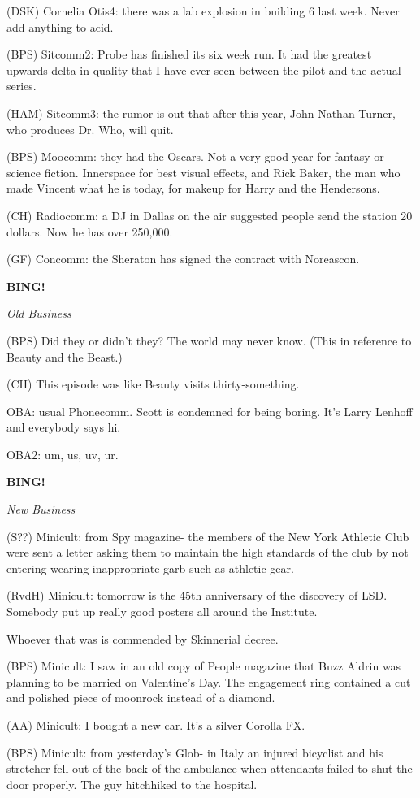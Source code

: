 \documentclass[12pt]{article}
\newcommand{\bing}{{\bf BING!} }
\newcommand{\goto}[1]{\bing \vskip 12pt \centerline{{\em{#1}}}}
\begin{document}
(DSK) Cornelia Otis4: there was a lab explosion in building 6 last week. Never add anything to acid.

(BPS) Sitcomm2: Probe has finished its six week run. It had the greatest upwards delta in quality that I have ever seen between the pilot and the actual series.

(HAM) Sitcomm3: the rumor is out that after this year, John Nathan Turner, who produces Dr. Who, will quit.

(BPS) Moocomm: they had the Oscars. Not a very good year for fantasy or science fiction. Innerspace for best visual effects, and Rick Baker, the man who made Vincent what he is today, for makeup for Harry and the Hendersons.

(CH) Radiocomm: a DJ in Dallas on the air suggested people send the station 20 dollars. Now he has over 250,000.

(GF) Concomm: the Sheraton has signed the contract with Noreascon.

\goto{Old Business}

(BPS) Did they or didn't they? The world may never know. (This in reference to Beauty and the Beast.)

(CH) This episode was like Beauty visits thirty-something.

OBA: usual Phonecomm. Scott is condemned for being boring. It's Larry Lenhoff and everybody says hi.

OBA2: um, us, uv, ur.

\goto{New Business}

(S??) Minicult: from Spy magazine- the members of the New York Athletic Club were sent a letter asking them to maintain the high standards of the club by not entering wearing inappropriate garb such as athletic gear.

(RvdH) Minicult: tomorrow is the 45th anniversary of the discovery of LSD. Somebody put up really good posters all around the Institute.

Whoever that was is commended by Skinnerial decree.

(BPS) Minicult: I saw in an old copy of People magazine that Buzz Aldrin was planning to be married on Valentine's Day. The engagement ring contained a cut and polished piece of moonrock instead of a diamond.

(AA) Minicult: I bought a new car. It's a silver Corolla FX.

(BPS) Minicult: from yesterday's Glob- in Italy an injured bicyclist and his stretcher fell out of the back of the ambulance when attendants failed to shut the door properly. The guy hitchhiked to the hospital.
\end{document}
